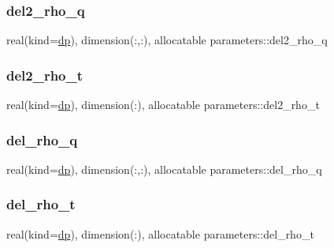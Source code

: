 \subsubsection{\texorpdfstring{del2\+\_\+rho\+\_\+q}{del2\_rho\_q}}
{\footnotesize\ttfamily real(kind=\mbox{\hyperlink{namespaceparameters_a52f8c6351fd79345d8811e065bcbbb37}{dp}}), dimension(\+:,\+:), allocatable parameters\+::del2\+\_\+rho\+\_\+q}

\mbox{\label{group__DENSITIES_ga419642d914eb5865bb3537f5a4df7d34}} 
\subsubsection{\texorpdfstring{del2\+\_\+rho\+\_\+t}{del2\_rho\_t}}
{\footnotesize\ttfamily real(kind=\mbox{\hyperlink{namespaceparameters_a52f8c6351fd79345d8811e065bcbbb37}{dp}}), dimension(\+:), allocatable parameters\+::del2\+\_\+rho\+\_\+t}

\mbox{\label{group__DENSITIES_ga8a7e7d5715287b287f2153291460783b}} 
\subsubsection{\texorpdfstring{del\+\_\+rho\+\_\+q}{del\_rho\_q}}
{\footnotesize\ttfamily real(kind=\mbox{\hyperlink{namespaceparameters_a52f8c6351fd79345d8811e065bcbbb37}{dp}}), dimension(\+:,\+:), allocatable parameters\+::del\+\_\+rho\+\_\+q}

\mbox{\label{group__DENSITIES_ga4d25fcfcb307d476b79d22bc2abe545b}} 
\subsubsection{\texorpdfstring{del\+\_\+rho\+\_\+t}{del\_rho\_t}}
{\footnotesize\ttfamily real(kind=\mbox{\hyperlink{namespaceparameters_a52f8c6351fd79345d8811e065bcbbb37}{dp}}), dimension(\+:), allocatable parameters\+::del\+\_\+rho\+\_\+t}

